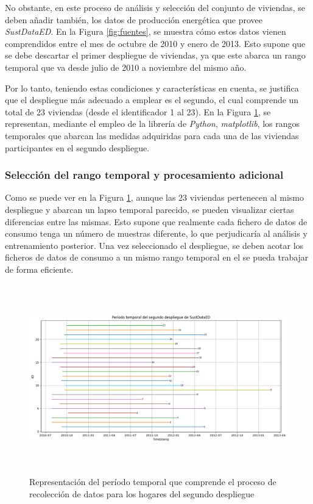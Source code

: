 \vspace{3mm}

No obstante, en este proceso de análisis y selección del conjunto de viviendas, se deben añadir también, los datos de producción energética que provee \textit{SustDataED}. En la Figura \ref{fig:fuentes}, se muestra cómo estos datos vienen comprendidos entre el mes de octubre de 2010 y enero de 2013. Esto supone que se debe descartar el primer despliegue de viviendas, ya que este abarca un rango temporal que va desde julio de 2010 a noviembre del mismo año.

\vspace{3mm}

Por lo tanto, teniendo estas condiciones y características en cuenta, se justifica que el despliegue más adecuado a emplear es el segundo, el cual comprende un total de 23 viviendas (desde el identificador 1 al 23). En la Figura \ref{fig:despliegue2}, se representan, mediante el empleo de la librería de \textit{Python}, \textit{matplotlib}, los rangos temporales que abarcan las medidas adquiridas para cada una de las viviendas participantes en el segundo despliegue.

\subsubsection{Selección del rango temporal y procesamiento adicional}
\label{sec:rango}

Como se puede ver en la Figura \ref{fig:despliegue2}, aunque las 23 viviendas pertenecen al mismo despliegue y abarcan un lapso temporal parecido, se pueden visualizar ciertas diferencias entre las mismas. Esto supone que realmente cada fichero de datos de consumo tenga un número de muestras diferente, lo que perjudicaría al análisis y entrenamiento posterior. Una vez seleccionado el despliegue, se deben acotar los ficheros de datos de consumo a un mismo rango temporal en el se pueda trabajar de forma eficiente. 

\vspace{3mm}

\begin{figure}[H]
    \centering
    \includegraphics[width=1\textwidth,height=8.2cm]{img/diseno/despliegue2.png}
    \caption{Representación del período temporal que comprende el proceso de recolección de datos para los hogares del segundo despliegue}
    \label{fig:despliegue2}
\end{figure}

